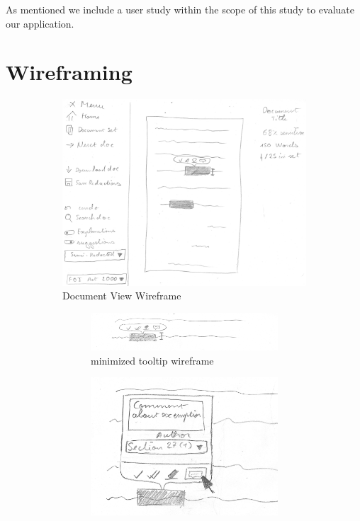 \documentclass[\version]{l4proj}
\begin{document}
As mentioned we include a user study within the scope of this study to evaluate our application.

\section{Wireframing}

\begin{figure}[H]
    \centering
    \begin{subfigure}[b]{\linewidth}
        \centering
        \includegraphics[width=0.6\linewidth]{images/wireframes/doc_view.jpg}
        \caption{Document View Wireframe}\label{fig:document-wireframe}
    \end{subfigure}
    \begin{subfigure}[b]{\linewidth}
        \begin{subfigure}[b]{0.5\linewidth}
            \includegraphics[width=\linewidth]{images/wireframes/tooltip.jpg}
            \caption{minimized tooltip wireframe}\label{fig:tooltip-wireframe}
        \end{subfigure}
        \begin{subfigure}[b]{0.4\linewidth}
            \includegraphics[width=\linewidth]{images/wireframes/tooltip_comment.jpg}

\end{subfigure}
\end{subfigure}
\end{figure}
\end{document}

